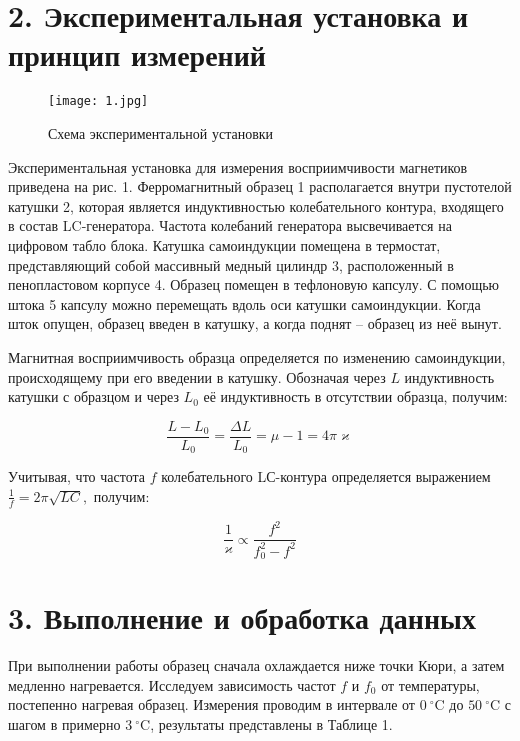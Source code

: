 \documentclass[a4paper,12pt]{article}
\begin{document}
\section*{2. Экспериментальная установка и принцип измерений}

\begin{figure}[h!]
\begin{center}
\texttt{[image: 1.jpg]}
\caption{Схема экспериментальной установки}
\end{center}
\end{figure}

Экспериментальная установка для измерения восприимчивости магнетиков приведена на рис. 1.  Ферромагнитный образец 1 располагается внутри пустотелой катушки 2, которая является индуктивностью колебательного контура, входящего в состав LC-генератора. Частота колебаний генератора высвечивается на цифровом табло блока. Катушка самоиндукции помещена в термостат, представляющий собой массивный медный цилиндр 3, расположенный в пенопластовом корпусе 4. Образец помещен в тефлоновую капсулу. С помощью штока 5 капсулу можно перемещать вдоль оси катушки самоиндукции. Когда шток опущен, образец введен в катушку, а когда поднят -- образец из неё вынут.

Магнитная восприимчивость образца определяется по изменению самоиндукции, происходящему при его введении в катушку. Обозначая через $L$ индуктивность катушки с образцом и через $L_0$ её индуктивность в отсутствии образца, получим:

$$ \frac{L-L_{0}}{L_{0}}=\frac{\Delta L}{L_{0}}=\mu-1 = 4 \pi \varkappa$$

Учитывая, что частота $f$ колебательного LС-контура определяется выражением $\frac{1}{f}=2 \pi \sqrt{L C},$ получим:

\begin{equation}\label{dependency}
    \frac{1}{\varkappa} \propto \frac{f^{2}}{f_{0}^{2}-f^{2}}
\end{equation}  
	
\section*{3. Выполнение и обработка данных}
При выполнении работы образец сначала охлаждается ниже точки Кюри, а затем медленно нагревается. Исследуем зависимость частот $f$ и $f_0$ от температуры, постепенно нагревая образец. Измерения  проводим в интервале от $0~^\circ \text{C}$ до $50~^\circ \text{C}$ с шагом в примерно $3~^\circ \text{C}$, результаты представлены в Таблице 1.
\end{document}
